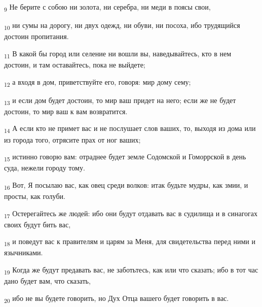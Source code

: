 \begin{tcolorbox}
\textsubscript{9} Не берите с собою ни золота, ни серебра, ни меди в поясы свои,
\end{tcolorbox}
\begin{tcolorbox}
\textsubscript{10} ни сумы на дорогу, ни двух одежд, ни обуви, ни посоха, ибо трудящийся достоин пропитания.
\end{tcolorbox}
\begin{tcolorbox}
\textsubscript{11} В какой бы город или селение ни вошли вы, наведывайтесь, кто в нем достоин, и там оставайтесь, пока не выйдете;
\end{tcolorbox}
\begin{tcolorbox}
\textsubscript{12} а входя в дом, приветствуйте его, говоря: мир дому сему;
\end{tcolorbox}
\begin{tcolorbox}
\textsubscript{13} и если дом будет достоин, то мир ваш придет на него; если же не будет достоин, то мир ваш к вам возвратится.
\end{tcolorbox}
\begin{tcolorbox}
\textsubscript{14} А если кто не примет вас и не послушает слов ваших, то, выходя из дома или из города того, отрясите прах от ног ваших;
\end{tcolorbox}
\begin{tcolorbox}
\textsubscript{15} истинно говорю вам: отраднее будет земле Содомской и Гоморрской в день суда, нежели городу тому.
\end{tcolorbox}
\begin{tcolorbox}
\textsubscript{16} Вот, Я посылаю вас, как овец среди волков: итак будьте мудры, как змии, и просты, как голуби.
\end{tcolorbox}
\begin{tcolorbox}
\textsubscript{17} Остерегайтесь же людей: ибо они будут отдавать вас в судилища и в синагогах своих будут бить вас,
\end{tcolorbox}
\begin{tcolorbox}
\textsubscript{18} и поведут вас к правителям и царям за Меня, для свидетельства перед ними и язычниками.
\end{tcolorbox}
\begin{tcolorbox}
\textsubscript{19} Когда же будут предавать вас, не заботьтесь, как или что сказать; ибо в тот час дано будет вам, что сказать,
\end{tcolorbox}
\begin{tcolorbox}
\textsubscript{20} ибо не вы будете говорить, но Дух Отца вашего будет говорить в вас.
\end{tcolorbox}
